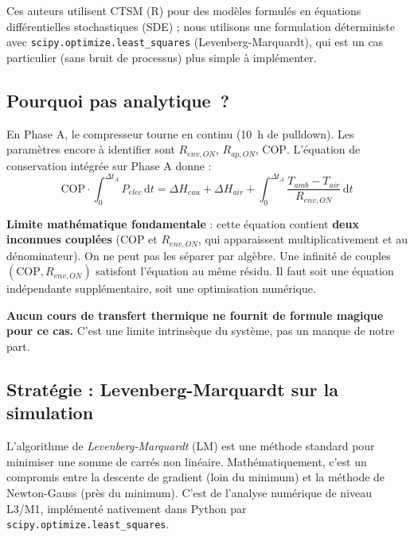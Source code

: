 \documentclass[11pt,a4paper]{article}
\begin{document}
Ces auteurs utilisent CTSM (R) pour des modèles formulés en équations différentielles
stochastiques (SDE) ; nous utilisons une formulation déterministe avec
\verb|scipy.optimize.least_squares| (Levenberg-Marquardt), qui est un cas particulier
(sans bruit de processus) plus simple à implémenter.

\subsection{Pourquoi pas analytique~?}

En Phase A, le compresseur tourne en continu (\SI{10}{\hour} de pulldown). Les paramètres
encore à identifier sont $R_{env,ON}$, $R_{ap,ON}$, $\mathrm{COP}$. L'équation de conservation
intégrée sur Phase A donne :
\begin{equation}
\mathrm{COP} \cdot \int_0^{\Delta t_A} P_{elec}\,\mathrm{d}t
= \Delta H_{eau} + \Delta H_{air} + \int_0^{\Delta t_A}\frac{T_{amb}-T_{air}}{R_{env,ON}}\,\mathrm{d}t
\label{eq:enthA}
\end{equation}

\begin{honnete}
\textbf{Limite mathématique fondamentale} : cette équation contient \textbf{deux inconnues
couplées} ($\mathrm{COP}$ et $R_{env,ON}$, qui apparaissent multiplicativement et au
dénominateur). On ne peut pas les séparer par algèbre. Une infinité de couples
$(\mathrm{COP}, R_{env,ON})$ satisfont l'équation au même résidu. Il faut soit une équation
indépendante supplémentaire, soit une optimisation numérique.

\textbf{Aucun cours de transfert thermique ne fournit de formule magique pour ce cas.} C'est
une limite intrinsèque du système, pas un manque de notre part.
\end{honnete}

\subsection{Stratégie : Levenberg-Marquardt sur la simulation}

\begin{rappel}
L'algorithme de \emph{Levenberg-Marquardt} (LM) est une méthode standard pour minimiser une
somme de carrés non linéaire. Mathématiquement, c'est un compromis entre la descente de
gradient (loin du minimum) et la méthode de Newton-Gauss (près du minimum). C'est de
l'analyse numérique de niveau L3/M1, implémenté nativement dans Python par
\verb|scipy.optimize.least_squares|.
\end{rappel}
\end{document}
